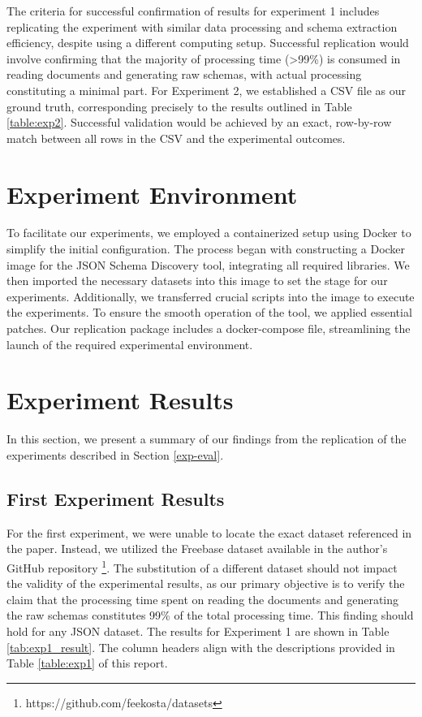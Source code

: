\documentclass[sigconf, nonacm]{acmart}
\begin{document}
The criteria for successful confirmation of results for experiment 1 includes replicating the experiment with similar data processing and schema extraction efficiency, despite using a different computing setup. Successful replication would involve confirming that the majority of processing time (>99\%) is consumed in reading documents and generating raw schemas, with actual processing constituting a minimal part. For Experiment 2, we established a CSV file as our ground truth, corresponding precisely to the results outlined in Table \ref{table:exp2}. Successful validation would be achieved by an exact, row-by-row match between all rows in the CSV and the experimental outcomes.

\section{Experiment Environment}
To facilitate our experiments, we employed a containerized setup using Docker to simplify the initial configuration. The process began with constructing a Docker image for the JSON Schema Discovery tool, integrating all required libraries. We then imported the necessary datasets into this image to set the stage for our experiments. Additionally, we transferred crucial scripts into the image to execute the experiments. To ensure the smooth operation of the tool, we applied essential patches. Our replication package includes a docker-compose file, streamlining the launch of the required experimental environment.

\section{Experiment Results}
In this section, we present a summary of our findings from the replication of the experiments described in Section \ref{exp-eval}.

\subsection{First Experiment Results}

For the first experiment, we were unable to locate the exact dataset referenced in the paper. Instead, we utilized the Freebase dataset available in the author's GitHub repository \footnote{https://github.com/feekosta/datasets}. The substitution of a different dataset should not impact the validity of the experimental results, as our primary objective is to verify the claim that the processing time spent on reading the documents and generating the raw schemas constitutes 99\% of the total processing time. This finding should hold for any JSON dataset. The results for Experiment 1 are shown in Table \ref{tab:exp1_result}. The column headers align with the descriptions provided in Table \ref{table:exp1} of this report.

\end{document}

